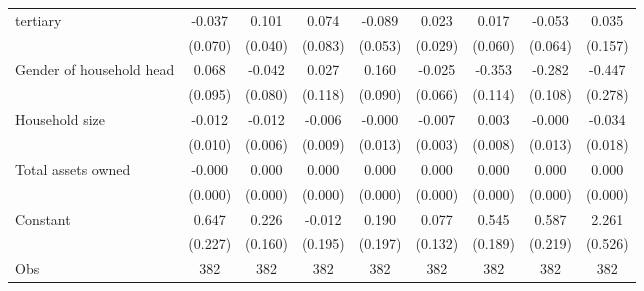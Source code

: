 {\begin{tabular}{l*{8}{c}}
tertiary            &-0.037         &0.101\sym{**} &0.074         &-0.089         &0.023         &0.017         &-0.053         &0.035         \\
                    &(0.070)         &(0.040)         &(0.083)         &(0.053)         &(0.029)         &(0.060)         &(0.064)         &(0.157)         \\
Gender of household head&0.068         &-0.042         &0.027         &0.160         &-0.025         &-0.353\sym{**} &-0.282\sym{**} &-0.447         \\
                    &(0.095)         &(0.080)         &(0.118)         &(0.090)         &(0.066)         &(0.114)         &(0.108)         &(0.278)         \\
Household size      &-0.012         &-0.012\sym{*}  &-0.006         &-0.000         &-0.007\sym{**} &0.003         &-0.000         &-0.034\sym{*}  \\
                    &(0.010)         &(0.006)         &(0.009)         &(0.013)         &(0.003)         &(0.008)         &(0.013)         &(0.018)         \\
Total assets owned  &-0.000\sym{*}  &0.000         &0.000\sym{**} &0.000         &0.000         &0.000         &0.000\sym{*}  &0.000         \\
                    &(0.000)         &(0.000)         &(0.000)         &(0.000)         &(0.000)         &(0.000)         &(0.000)         &(0.000)         \\
Constant            &0.647\sym{**} &0.226         &-0.012         &0.190         &0.077         &0.545\sym{**} &0.587\sym{**} &2.261\sym{***}\\
                    &(0.227)         &(0.160)         &(0.195)         &(0.197)         &(0.132)         &(0.189)         &(0.219)         &(0.526)         \\
\hline
Obs                 &  382         &  382         &  382         &  382         &  382         &  382         &  382         &  382         \\
\hline\hline
\end{tabular}
}
